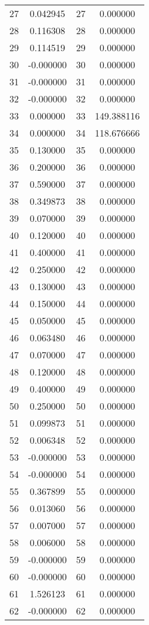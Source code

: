 \documentclass[12pt]{article}
\begin{document}
\begin{longtable}{@{}cccc@{}}
27 & 0.042945 & 27 & 0.000000 \\
28 & 0.116308 & 28 & 0.000000 \\
29 & 0.114519 & 29 & 0.000000 \\
30 & -0.000000 & 30 & 0.000000 \\
31 & -0.000000 & 31 & 0.000000 \\
32 & -0.000000 & 32 & 0.000000 \\
33 & 0.000000 & 33 & 149.388116 \\
34 & 0.000000 & 34 & 118.676666 \\
35 & 0.130000 & 35 & 0.000000 \\
36 & 0.200000 & 36 & 0.000000 \\
37 & 0.590000 & 37 & 0.000000 \\
38 & 0.349873 & 38 & 0.000000 \\
39 & 0.070000 & 39 & 0.000000 \\
40 & 0.120000 & 40 & 0.000000 \\
41 & 0.400000 & 41 & 0.000000 \\
42 & 0.250000 & 42 & 0.000000 \\
43 & 0.130000 & 43 & 0.000000 \\
44 & 0.150000 & 44 & 0.000000 \\
45 & 0.050000 & 45 & 0.000000 \\
46 & 0.063480 & 46 & 0.000000 \\
47 & 0.070000 & 47 & 0.000000 \\
48 & 0.120000 & 48 & 0.000000 \\
49 & 0.400000 & 49 & 0.000000 \\
50 & 0.250000 & 50 & 0.000000 \\
51 & 0.099873 & 51 & 0.000000 \\
52 & 0.006348 & 52 & 0.000000 \\
53 & -0.000000 & 53 & 0.000000 \\
54 & -0.000000 & 54 & 0.000000 \\
55 & 0.367899 & 55 & 0.000000 \\
56 & 0.013060 & 56 & 0.000000 \\
57 & 0.007000 & 57 & 0.000000 \\
58 & 0.006000 & 58 & 0.000000 \\
59 & -0.000000 & 59 & 0.000000 \\
60 & -0.000000 & 60 & 0.000000 \\
61 & 1.526123 & 61 & 0.000000 \\
62 & -0.000000 & 62 & 0.000000 \\

\end{longtable}
\end{document}
